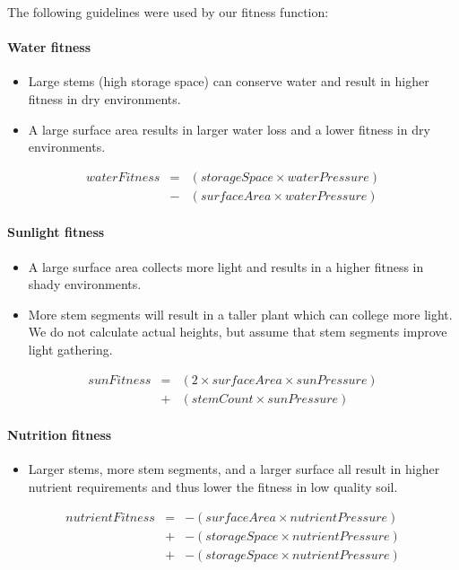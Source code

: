 \documentclass[conference]{acmsiggraph}
\begin{document}
The following guidelines were used by our fitness function:

\paragraph{Water fitness}
\begin{itemize}
  \item Large stems (high storage space) can conserve water and result in higher
    fitness in dry environments.
  \item A large surface area results in larger water loss and a lower
    fitness in dry environments.
\end{itemize}
\vspace{-0.5em}
\begin{eqnarray*}
waterFitness &=& (storageSpace \times waterPressure) \\
             &-& (surfaceArea \times waterPressure)
\end{eqnarray*}

\paragraph{Sunlight fitness}
\begin{itemize}
  \item A large surface area collects more light and results in a higher fitness
    in shady environments.
  \item More stem segments will result in a taller plant which can college more
    light. We do not calculate actual heights, but assume that stem segments
    improve light gathering.
\end{itemize}
\vspace{-0.5em}
\begin{eqnarray*}
sunFitness &=& (2 \times surfaceArea \times sunPressure) \\
           &+& (stemCount \times sunPressure)
\end{eqnarray*}

\paragraph{Nutrition fitness}
\begin{itemize}
  \item Larger stems, more stem segments, and a larger surface all result in
    higher nutrient requirements and thus lower the fitness in low quality soil.
\end{itemize}
\vspace{-0.5em}
\begin{eqnarray*}
nutrientFitness &=&-(surfaceArea \times nutrientPressure) \\
                &+&-(storageSpace \times nutrientPressure) \\
                &+&-(storageSpace \times nutrientPressure)
\end{eqnarray*}
\end{document}

